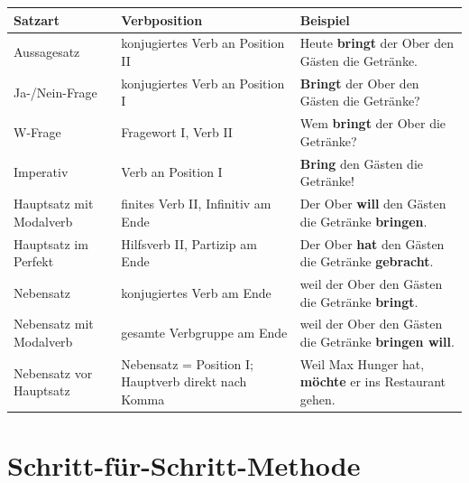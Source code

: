 \documentclass[a4paper,11pt]{article}
\newcommand{\TableHeader}[1]{\color{white}\textbf{#1}}
\begin{document}
        \begin{longtable}{|p{3.0cm}|p{4.2cm}|p{7.0cm}|}
            \hline
            \rowcolor{HeaderBlueDark}
            \TableHeader{Satzart} & \TableHeader{Verbposition} & \TableHeader{Beispiel} \\
            \hline
            Aussagesatz & konjugiertes Verb an Position II & Heute \textbf{bringt} der Ober den Gästen die Getränke. \\
            \hline
            Ja-/Nein-Frage & konjugiertes Verb an Position I & \textbf{Bringt} der Ober den Gästen die Getränke? \\
            \hline
            W-Frage & Fragewort I, Verb II & Wem \textbf{bringt} der Ober die Getränke? \\
            \hline
            Imperativ & Verb an Position I & \textbf{Bring} den Gästen die Getränke! \\
            \hline
            Hauptsatz mit Modalverb & finites Verb II, Infinitiv am Ende & Der Ober \textbf{will} den Gästen die Getränke \textbf{bringen}. \\
            \hline
            Hauptsatz im Perfekt & Hilfsverb II, Partizip am Ende & Der Ober \textbf{hat} den Gästen die Getränke \textbf{gebracht}. \\
            \hline
            Nebensatz & konjugiertes Verb am Ende & weil der Ober den Gästen die Getränke \textbf{bringt}. \\
            \hline
            Nebensatz mit Modalverb & gesamte Verbgruppe am Ende & weil der Ober den Gästen die Getränke \textbf{bringen will}. \\
            \hline
            Nebensatz vor Hauptsatz & Nebensatz = Position I; Hauptverb direkt nach Komma & Weil Max Hunger hat, \textbf{möchte} er ins Restaurant gehen. \\
            \hline
        \end{longtable}
    
    
    \section{Schritt-für-Schritt-Methode}
        
\end{document}
